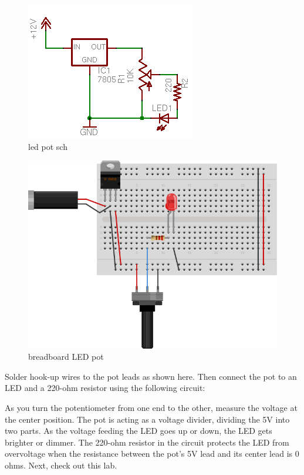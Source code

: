 \begin{figure}[!htb]
 \centering
 \includegraphics[scale=0.8]{img/electronics/led_pot_sch.png}
 \caption{led pot sch}
 \label{led pot sch}
\end{figure}

\begin{figure}[!htb]
 \centering
 \includegraphics[scale=0.8]{img/electronics/breadboard_LED_pot.png}
 \caption{breadboard LED pot}
 \label{breadboard LED pot}
\end{figure}


Solder hook-up wires to the pot leads as shown here. Then connect the pot to an LED and a 220-ohm resistor using the following circuit:


As you turn the potentiometer from one end to the other, measure the voltage at the center position. The pot is acting as a voltage divider, dividing the 5V into two parts. As the voltage feeding the LED goes up or down, the LED gets brighter or dimmer. The 220-ohm resistor in the circuit protects the LED from overvoltage when the resistance between the pot's 5V lead and its center lead is 0 ohms.
Next, check out this lab.


